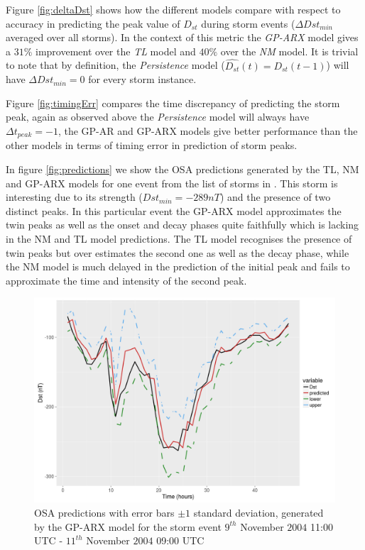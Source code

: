 \documentclass[referee,a4paper,12pt,traditabstract]{swsc}
\begin{document}
\begin{linenumbers}
Figure \ref{fig:deltaDst} shows how the different models compare with respect to accuracy in predicting the peak value of $D_{st}$ during storm events ($\Delta Dst_{min}$ averaged over all storms). In the context of this metric the \emph{GP-ARX} model gives a $31\%$ improvement over the \emph{TL} model and $40\%$ over the \emph{NM} model. It is trivial to note that by definition, the \emph{Persistence} model ($\hat{D_{st}}(t) = D_{st}(t-1)$) will have $\Delta Dst_{min} = 0$ for every storm instance.

Figure \ref{fig:timingErr} compares the time discrepancy of predicting the storm peak, again as observed above the \emph{Persistence} model will always have $\Delta t_{peak} = -1$, the GP-AR and GP-ARX models give better performance than the other models in terms of timing error in prediction of storm peaks. 

In figure \ref{fig:predictions} we show the OSA predictions generated by the TL, NM and GP-ARX models for one event from the list of storms in \citet{Ji2012}. This storm is interesting due to its strength ($Dst_{min} = -289 nT$) and the presence of two distinct peaks. In this particular event the GP-ARX model approximates the twin peaks as well as the onset and decay phases quite faithfully which is lacking in the NM and TL model predictions. The TL model recognises the presence of twin peaks but over estimates the second one as well as the decay phase, while the NM model is much delayed in the prediction of the initial peak and fails to approximate the time and intensity of the second peak.



\begin{figure}
   \centering
   \includegraphics[width=\textwidth]{Compare_pred_err_bar.png}
      \caption{OSA predictions with error bars $\pm 1$ standard deviation, generated by the GP-ARX model for the storm event $9^{th}$ November $2004$ 11:00 UTC - $11^{th}$ November $2004$ 09:00 UTC}
         \label{fig:predictionswitherrorbar}
\end{figure}



\end{linenumbers}
\end{document}
